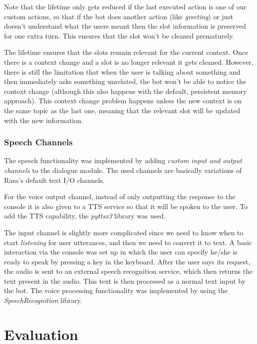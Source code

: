 \documentclass[11pt,a4paper]{article}
\begin{document}
			Note that the lifetime only gets reduced if the last executed action is one of our custom actions, so that if the bot does another action (like \textit{greeting}) or just doesn't understand what the users meant then the slot information is preserved for one extra turn. This ensures that the slot won't be cleaned prematurely.
			
			The lifetime ensures that the slots remain relevant for the current context. Once there is a context change and a slot is no longer relevant it gets cleaned. However, there is still the limitation that when the user is talking about something and then immediately asks something unrelated, the bot won't be able to notice the context change (although this also happens with the default, persistent memory approach). This context change problem happens unless the new context is on the same topic as the last one, meaning that the relevant slot will be updated with the new information.
			
		\subsubsection{Speech Channels}
		\label{sec-speech}
		
			The speech functionality was implemented by adding \textit{custom input and output channels} to the dialogue module. The used channels are basically variations of Rasa's default text I/O channels. 
			
			For the voice output channel, instead of only outputting the response to the console it is also given to a TTS service so that it will be spoken to the user. To add the TTS capability, the \textit{pyttsx3} \cite{ttspy} library was used.
			
			The input channel is slightly more complicated since we need to know when to start \textit{listening} for user utterances, and then we need to convert it to text. A basic interaction via the console was set up in which the user can specify he/she is ready to speak by pressing a key in the keyboard. After the user says its request, the audio is sent to an external speech recognition service, which then returns the text present in the audio. This text is then processed as a normal text input by the bot. The voice processing functionality was implemented by using the \textit{SpeechRecognition} \cite{SpeechRecognition} library.
			
			
\section{Evaluation}
\label{sec-evaluation}
\end{document}
